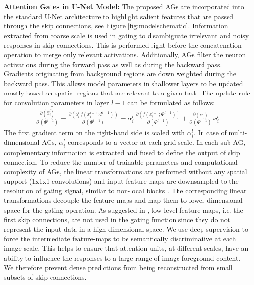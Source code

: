 \documentclass{article}
\begin{document}
\textbf{Attention Gates in U-Net Model:} The proposed AGs are incorporated into the standard U-Net architecture to highlight salient features that are passed through the skip connections, see Figure \ref{fig:modelschematic}. Information extracted from coarse scale is used in gating to disambiguate irrelevant and noisy responses in skip connections. This is performed right before the concatenation operation to merge only relevant activations. Additionally, AGs filter the neuron activations during the forward pass as well as during the backward pass. Gradients originating from background regions are down weighted during the backward pass. This allows model parameters in shallower layers to be updated mostly based on spatial regions that are relevant to a given task. The update rule for convolution parameters in layer $l-1$ can be formulated as follows:   
\begin{eqnarray}
\frac{\partial (\hat{x}_i^l)}{\partial \, (\Phi^{l-1})}= \frac{\partial \left(\alpha_i^l \, f(x_i^{l-1}; \Phi^{l-1})\right)}{\partial \, (\Phi^{l-1})} 
= \alpha_i^l \, \frac{\partial(f(x_i^{l-1}; \Phi^{l-1}))}{\partial \, (\Phi^{l-1})} + \frac{\partial (\alpha_i^l)}{\partial \, (\Phi^{l-1})} \, x_i^l
\end{eqnarray}
The first gradient term on the right-hand side is scaled with $\alpha_i^l$. In case of multi-dimensional AGs, $\alpha_i^l$ corresponds to a vector at each grid scale. In each sub-AG, complementary information is extracted and fused to define the output of skip connection. To reduce the number of trainable parameters and computational complexity of AGs, the linear transformations are performed without any spatial support (1x1x1 convolutions) and input feature-maps are downsampled to the resolution of gating signal, similar to non-local blocks \cite{wang2017non}. The corresponding linear transformations decouple the feature-maps and map them to lower dimensional space for the gating operation. As suggested in \cite{jetley2018learn}, low-level feature-maps, i.e. the first skip connections, are not used in the gating function since they do not represent the input data in a high dimensional space. We use deep-supervision \cite{lee2015deeply} to force the intermediate feature-maps to be semantically discriminative at each image scale. This helps to ensure that attention units, at different scales, have an ability to influence the responses to a large range of image foreground content. We therefore prevent dense predictions from being reconstructed from small subsets of skip connections.
\end{document}
